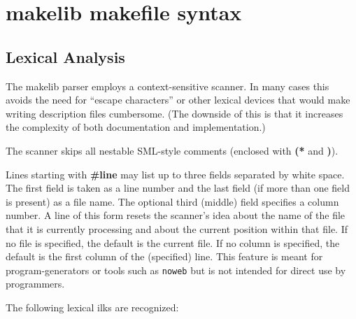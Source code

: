 
\section{makelib makefile syntax}

\subsection{Lexical Analysis}

The makelib parser employs a context-sensitive scanner.  In many cases this
avoids the need for ``escape characters'' or other lexical devices
that would make writing description files cumbersome.  (The downside
of this is that it increases the complexity of both documentation and
implementation.)

The scanner skips all nestable SML-style comments (enclosed with {\bf
(*} and {\bf *)}).

Lines starting with {\bf \#line} may list up to three fields separated
by white space.  The first field is taken as a line number and the
last field (if more than one field is present) as a file name.  The
optional third (middle) field specifies a column number.  A line of
this form resets the scanner's idea about the name of the file that it
is currently processing and about the current position within that
file.  If no file is specified, the default is the current file.  If
no column is specified, the default is the first column of the
(specified) line.  This feature is meant for program-generators or
tools such as {\tt noweb} but is not intended for direct use by
programmers.

The following lexical ilks are recognized:

